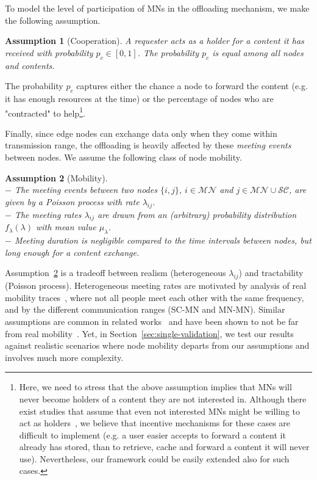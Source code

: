 \documentclass[10pt,conference,letterpaper]{IEEEtran}
\newtheorem{assumption}{Assumption}
\begin{document}
To model the level of participation of MNs in the offloading mechanism, we make the following assumption.
\begin{assumption}[Cooperation]\label{ass:cooperation} A requester acts as a holder for a content it has received with probability $p_{c}\in[0,1]$. The probability $p_{c}$ is equal among all nodes and contents.
\end{assumption}

The probability $p_{c}$ captures either the chance a node to forward the content (e.g. it has enough resources at the time) or the percentage of nodes who are "contracted" to help\footnote{ Here, we need to stress that the above assumption implies that MNs will never become holders of a content they are not interested in. Although there exist studies that assume that even not interested MNs might be willing to act as holders~\cite{offloading-wowmom11,offloading-control-theory,fluid-limit-mass2012,offloading-double-opportunities}, we believe that incentive mechanisms for these cases are difficult to implement (e.g. a user easier accepts to forward a content it already has stored, than to retrieve, cache and forward a content it will never use). Nevertheless, our framework could be easily extended also for such cases.}.


Finally, since edge nodes can exchange data only when they come within transmission range, the offloading is heavily affected by these \textit{meeting events} between nodes. We assume the following class of node mobility.
\begin{assumption}[Mobility]\label{ass:heterogeneous-mobility}~\\
$-$ The meeting events between two nodes $\{i,j\}$, $i\in\mathcal{MN}$ and $j\in\mathcal{MN}\cup\mathcal{SC}$, are given by a Poisson process with rate $\lambda_{ij}$.\\
$-$ The meeting rates $\lambda_{ij}$ are drawn from an (arbitrary) probability distribution $f_{\lambda}(\lambda)$ with mean value $\mu_{\lambda}$.\\
$-$ Meeting duration is negligible compared to the time intervals between nodes, but long enough for a content exchange.
\end{assumption}
Assumption~\ref{ass:heterogeneous-mobility} is a tradeoff between realism (heterogeneous $\lambda_{ij}$) and tractability (Poisson process). Heterogeneous meeting rates are motivated by analysis of real mobility traces~\cite{Gao2009,Conan2007}, where not all people meet each other with the same frequency, and by the different communication ranges (SC-MN and MN-MN). Similar assumptions are common in related works~\cite{Gao-user-centric-DTN,multiple-offloading,offloading-double-opportunities,fluid-limit-mass2012,offloading-control-theory} and have been shown to not be far from real mobility~\cite{Gao2009,Conan2007}. Yet, in Section~\ref{sec:single-validation}, we test our results against realistic scenarios where node mobility departs from our assumptions and involves much more complexity.
\end{document}
